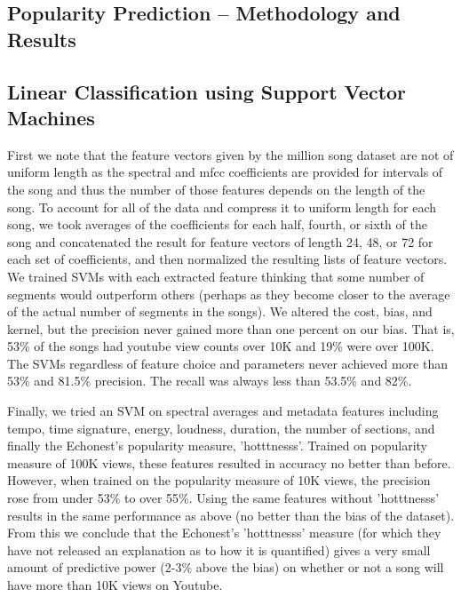 \documentclass[12pt]{amsart}
\begin{document}
\begin{multicols}{2}
\section {Popularity Prediction -- Methodology and Results}

\subsection{Linear Classification using Support Vector Machines}
First we note that the feature vectors given by the million song dataset are not of uniform length as the spectral and mfcc coefficients are provided for intervals of the song and thus the number of those features depends on the length of the song. To account for all of the data and compress it to uniform length for each song, we took averages of the coefficients for each half, fourth, or sixth of the song and concatenated the result for feature vectors of length 24, 48, or 72 for each set of coefficients, and then normalized the resulting lists of feature vectors. We trained SVMs with each extracted feature thinking that some number of segments would outperform others (perhaps as they become closer to the average of the actual number of segments in the songs). We altered the cost, bias, and kernel, but the precision never gained more than one percent on our bias. That is, 53\% of the songs had youtube view counts over 10K and 19\% were over 100K. The SVMs regardless of feature choice and parameters never achieved more than 53\% and 81.5\% precision. The recall was always less than 53.5\% and 82\%.

Finally, we tried an SVM on spectral averages and metadata features including tempo, time signature, energy, loudness, duration, the number of sections, and finally the Echonest's popularity measure, 'hotttnesss'. Trained on popularity measure of 100K views, these features resulted in accuracy no better than before. However, when trained on the popularity measure of 10K views, the precision rose from under 53\% to over 55\%. Using the same features without 'hotttnesss' results in the same performance as above (no better than the bias of the dataset). From this we conclude that the Echonest's 'hotttnesss' measure (for which they have not released an explanation as to how it is quantified) gives a very small amount of predictive power (2-3\% above the bias) on whether or not a song will have more than 10K views on Youtube.

\end{multicols}
\end{document}
